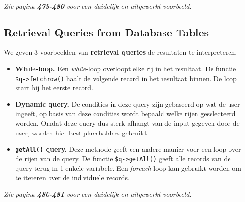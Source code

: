 ~

\noindent \textit{Zie pagina \textbf{479-480} voor een duidelijk en uitgewerkt voorbeeld.}


\subsection{Retrieval Queries from Database Tables}
We geven 3 voorbeelden van \textbf{retrieval queries} de resultaten te interpreteren.

\begin{itemize}
	\item \textbf{While-loop.} Een \textit{while}-loop overloopt elke rij in het resultaat. De functie \texttt{\$q->fetchrow()} haalt de volgende record in het resultaat binnen. De loop start bij het eerste record.

	\item \textbf{Dynamic query.} De condities in deze query zijn gebaseerd op wat de user ingeeft, op basis van deze condities wordt bepaald welke rijen geselecteerd worden. Omdat deze query dus sterk afhangt van de input gegeven door de user, worden hier best placeholders gebruikt.

	\item \textbf{\texttt{getAll()} query.} Deze methode geeft een andere manier voor een loop over de rijen van de query. De functie \texttt{\$q->getAll()} geeft alle records van de query terug in 1 enkele variabele. Een \textit{foreach}-loop kan gebruikt worden om te itereren over de individuele records.
\end{itemize}

\noindent \textit{Zie pagina \textbf{480-481} voor een duidelijk en uitgewerkt voorbeeld.}